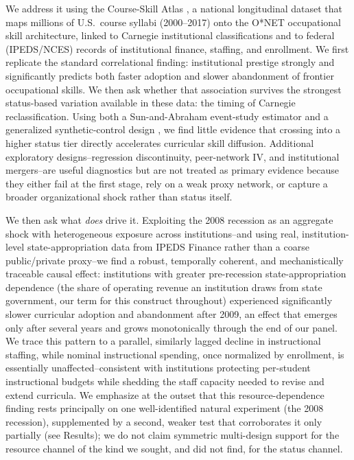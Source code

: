 \documentclass[11pt, letterpaper]{article}
\newcommand{\parencite}[1]{\cite{#1}}
\begin{document}
We address it using the Course-Skill Atlas \parencite{javadiansabet2024}, a national longitudinal dataset that maps millions of U.S.\ course syllabi (2000--2017) onto the O*NET occupational skill architecture, linked to Carnegie institutional classifications and to federal (IPEDS/NCES) records of institutional finance, staffing, and enrollment. We first replicate the standard correlational finding: institutional prestige strongly and significantly predicts both faster adoption and slower abandonment of frontier occupational skills. We then ask whether that association survives the strongest status-based variation available in these data: the timing of Carnegie reclassification. Using both a Sun-and-Abraham event-study estimator \parencite{sunabraham2021, goodmanbacon2021} and a generalized synthetic-control design \parencite{xu2017}, we find little evidence that crossing into a higher status tier directly accelerates curricular skill diffusion. Additional exploratory designs--regression discontinuity, peer-network IV, and institutional mergers--are useful diagnostics but are not treated as primary evidence because they either fail at the first stage, rely on a weak proxy network, or capture a broader organizational shock rather than status itself.

We then ask what \emph{does} drive it. Exploiting the 2008 recession as an aggregate shock with heterogeneous exposure across institutions--and using real, institution-level state-appropriation data from IPEDS Finance rather than a coarse public/private proxy--we find a robust, temporally coherent, and mechanistically traceable causal effect: institutions with greater pre-recession state-appropriation dependence (the share of operating revenue an institution draws from state government, our term for this construct throughout) experienced significantly slower curricular adoption and abandonment after 2009, an effect that emerges only after several years and grows monotonically through the end of our panel. We trace this pattern to a parallel, similarly lagged decline in instructional staffing, while nominal instructional spending, once normalized by enrollment, is essentially unaffected--consistent with institutions protecting per-student instructional budgets while shedding the staff capacity needed to revise and extend curricula. We emphasize at the outset that this resource-dependence finding rests principally on one well-identified natural experiment (the 2008 recession), supplemented by a second, weaker test that corroborates it only partially (see Results); we do not claim symmetric multi-design support for the resource channel of the kind we sought, and did not find, for the status channel.
\end{document}

